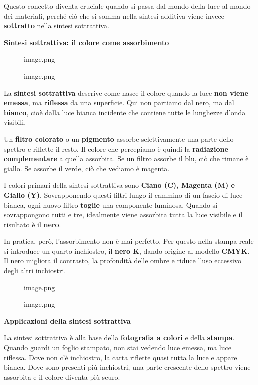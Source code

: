 \documentclass[
]{article}
\begin{document}
Questo concetto diventa cruciale quando si passa dal mondo della luce al mondo dei materiali, perché ciò che si somma nella sintesi additiva viene invece \textbf{sottratto} nella sintesi sottrattiva.

\textbf{Sintesi sottrattiva: il colore come assorbimento}

\begin{figure}
\centering
{image.png}
\caption{image.png}
\end{figure}

La \textbf{sintesi sottrattiva} descrive come nasce il colore quando la luce \textbf{non viene emessa}, ma \textbf{riflessa} da una superficie. Qui non partiamo dal nero, ma dal \textbf{bianco}, cioè dalla luce bianca incidente che contiene tutte le lunghezze d'onda visibili.

Un \textbf{filtro colorato} o un \textbf{pigmento} assorbe selettivamente una parte dello spettro e riflette il resto. Il colore che percepiamo è quindi la \textbf{radiazione complementare} a quella assorbita. Se un filtro assorbe il blu, ciò che rimane è giallo. Se assorbe il verde, ciò che vediamo è magenta.

I colori primari della sintesi sottrattiva sono \textbf{Ciano (C), Magenta (M) e Giallo (Y)}. Sovrapponendo questi filtri lungo il cammino di un fascio di luce bianca, ogni nuovo filtro \textbf{toglie} una componente luminosa. Quando si sovrappongono tutti e tre, idealmente viene assorbita tutta la luce visibile e il risultato è il \textbf{nero}.

In pratica, però, l'assorbimento non è mai perfetto. Per questo nella stampa reale si introduce un quarto inchiostro, il \textbf{nero K}, dando origine al modello \textbf{CMYK}. Il nero migliora il contrasto, la profondità delle ombre e riduce l'uso eccessivo degli altri inchiostri.

\begin{figure}
\centering
{image.png}
\caption{image.png}
\end{figure}

\textbf{Applicazioni della sintesi sottrattiva}

La sintesi sottrattiva è alla base della \textbf{fotografia a colori} e della \textbf{stampa}. Quando guardi un foglio stampato, non stai vedendo luce emessa, ma luce riflessa. Dove non c'è inchiostro, la carta riflette quasi tutta la luce e appare bianca. Dove sono presenti più inchiostri, una parte crescente dello spettro viene assorbita e il colore diventa più scuro.
\end{document}
